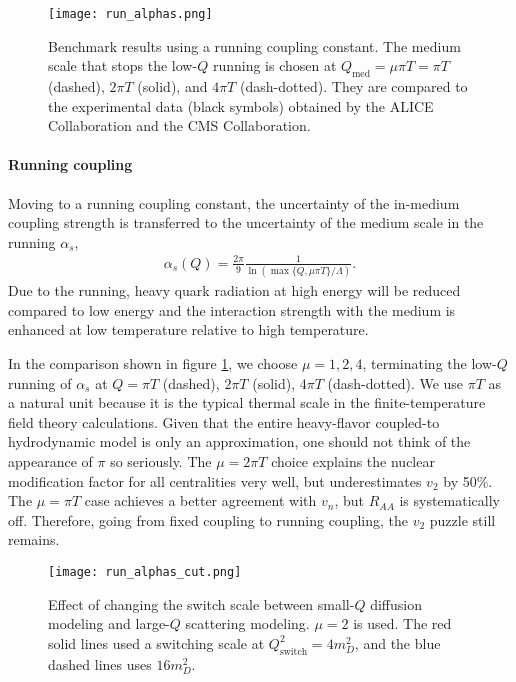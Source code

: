 \begin{figure}
\singlespacing
\centering
\texttt{[image: run\_alphas.png]}
\caption[Benchmark results using a running coupling constant. The]{Benchmark results using a running coupling constant. The medium scale that stops the low-$Q$ running is chosen at $Q_{\textrm{med}} = \mu\pi T = \pi T$ (dashed), $2\pi T$ (solid), and $4\pi T$ (dash-dotted). They are compared to the experimental data (black symbols) obtained by the ALICE Collaboration and the CMS Collaboration.}
\label{fig:new:run-a}
\end{figure}

\paragraph{Running coupling} Moving to a running coupling constant, the uncertainty of the in-medium coupling strength is transferred to the uncertainty of the medium scale in the running $\alpha_s$,
\begin{eqnarray}
\alpha_s(Q) = \frac{2\pi}{9}\frac{1}{\ln \left( \max\{Q, \mu\pi T\} / \Lambda\right)}.
\end{eqnarray}
Due to the running, heavy quark radiation at high energy will be reduced compared to low energy and the interaction strength with the medium is enhanced at low temperature relative to high temperature.

In the comparison shown in figure \ref{fig:new:run-a}, we choose $\mu = 1, 2, 4$, terminating the low-$Q$ running of $\alpha_s$ at $Q = \pi T$ (dashed), $2\pi T$ (solid), $4\pi T$ (dash-dotted).
We use $\pi T$ as a natural unit because it is the typical thermal scale in the finite-temperature field theory calculations.
Given that the entire heavy-flavor coupled-to hydrodynamic model is only an approximation, one should not think of the appearance of $\pi$ so seriously.
The $\mu=2\pi T$ choice explains the nuclear modification factor for all centralities very well, but underestimates $v_2$ by 50\%.
The $\mu=\pi T$ case achieves a better agreement with $v_n$, but $R_{AA}$ is systematically off.
Therefore, going from fixed coupling to running coupling, the $v_2$ puzzle still remains.

\begin{figure}
\singlespacing
\centering
\texttt{[image: run\_alphas\_cut.png]}
\caption[Effect of changing the switch scale between small-$Q$ diffusion]{Effect of changing the switch scale between small-$Q$ diffusion modeling and large-$Q$ scattering modeling. $\mu=2$ is used. The red solid lines used a switching scale at $Q_{\textrm{switch}}^2 = 4 m_D^2$, and the blue dashed lines uses $16 m_D^2$.}
\label{fig:new:run-cut}
\end{figure}
